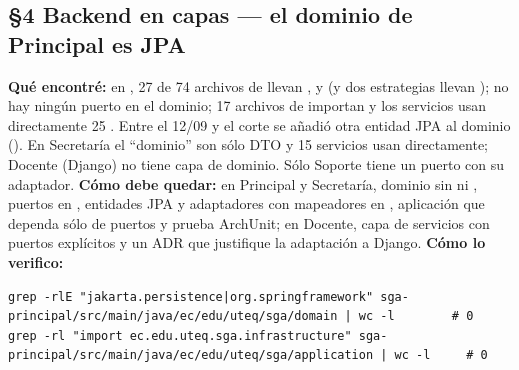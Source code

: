 \subsection*{\S4 Backend en capas --- el dominio de Principal es JPA}
\textbf{Qu\'e encontr\'e:} en , 27 de 74 archivos de  llevan ,  y  (y dos estrategias llevan ); no hay ning\'un puerto en el dominio; 17 archivos de  importan  y los servicios usan directamente 25 . Entre el 12/09 y el corte se a\~nadi\'o otra entidad JPA al dominio (). En Secretar\'ia el ``dominio'' son s\'olo DTO y 15 servicios usan  directamente; Docente (Django) no tiene capa de dominio. S\'olo Soporte tiene un puerto con su adaptador. \textbf{C\'omo debe quedar:} en Principal y Secretar\'ia, dominio sin  ni , puertos en , entidades JPA y adaptadores con mapeadores en , aplicaci\'on que dependa s\'olo de puertos y prueba ArchUnit; en Docente, capa de servicios con puertos expl\'icitos y un ADR que justifique la adaptaci\'on a Django. \textbf{C\'omo lo verifico:}\begin{verbatim}
grep -rlE "jakarta.persistence|org.springframework" sga-principal/src/main/java/ec/edu/uteq/sga/domain | wc -l        # 0
grep -rl "import ec.edu.uteq.sga.infrastructure" sga-principal/src/main/java/ec/edu/uteq/sga/application | wc -l     # 0
\end{verbatim}

